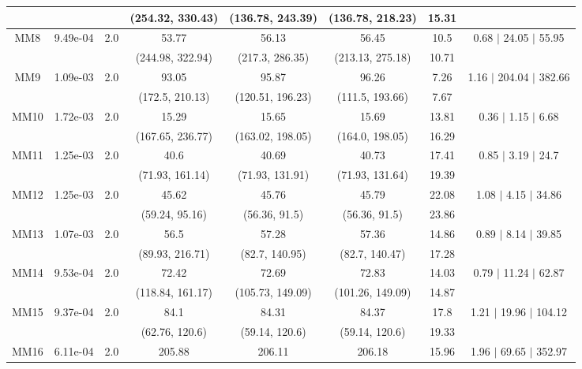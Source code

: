 \begin{longtable}{|c|c|c|c|c|c|c|c|}
	 &  &  & (254.32, 330.43) & (136.78, 243.39) & (136.78, 218.23) & 15.31 & \\
 	\hline
	\multirow{2}{*}{MM8} & \multirow{2}{*}{9.49e-04} & \multirow{2}{*}{2.0} & 53.77 & 56.13 & 56.45 & 10.5 & 0.68 $\mid$ 24.05 $\mid$ 55.95\\
	 &  &  & (244.98, 322.94) & (217.3, 286.35) & (213.13, 275.18) & 10.71 & \\
 	\hline
	\multirow{2}{*}{MM9} & \multirow{2}{*}{1.09e-03} & \multirow{2}{*}{2.0} & 93.05 & 95.87 & 96.26 & 7.26 & 1.16 $\mid$ 204.04 $\mid$ 382.66\\
	 &  &  & (172.5, 210.13) & (120.51, 196.23) & (111.5, 193.66) & 7.67 & \\
 	\hline
	\multirow{2}{*}{MM10} & \multirow{2}{*}{1.72e-03} & \multirow{2}{*}{2.0} & 15.29 & 15.65 & 15.69 & 13.81 & 0.36 $\mid$ 1.15 $\mid$ 6.68\\
	 &  &  & (167.65, 236.77) & (163.02, 198.05) & (164.0, 198.05) & 16.29 & \\
 	\hline
	\multirow{2}{*}{MM11} & \multirow{2}{*}{1.25e-03} & \multirow{2}{*}{2.0} & 40.6 & 40.69 & 40.73 & 17.41 & 0.85 $\mid$ 3.19 $\mid$ 24.7\\
	 &  &  & (71.93, 161.14) & (71.93, 131.91) & (71.93, 131.64) & 19.39 & \\
 	\hline
	\multirow{2}{*}{MM12} & \multirow{2}{*}{1.25e-03} & \multirow{2}{*}{2.0} & 45.62 & 45.76 & 45.79 & 22.08 & 1.08 $\mid$ 4.15 $\mid$ 34.86\\
	 &  &  & (59.24, 95.16) & (56.36, 91.5) & (56.36, 91.5) & 23.86 & \\
 	\hline
	\multirow{2}{*}{MM13} & \multirow{2}{*}{1.07e-03} & \multirow{2}{*}{2.0} & 56.5 & 57.28 & 57.36 & 14.86 & 0.89 $\mid$ 8.14 $\mid$ 39.85\\
	 &  &  & (89.93, 216.71) & (82.7, 140.95) & (82.7, 140.47) & 17.28 & \\
 	\hline
	\multirow{2}{*}{MM14} & \multirow{2}{*}{9.53e-04} & \multirow{2}{*}{2.0} & 72.42 & 72.69 & 72.83 & 14.03 & 0.79 $\mid$ 11.24 $\mid$ 62.87\\
	 &  &  & (118.84, 161.17) & (105.73, 149.09) & (101.26, 149.09) & 14.87 & \\
 	\hline
	\multirow{2}{*}{MM15} & \multirow{2}{*}{9.37e-04} & \multirow{2}{*}{2.0} & 84.1 & 84.31 & 84.37 & 17.8 & 1.21 $\mid$ 19.96 $\mid$ 104.12\\
	 &  &  & (62.76, 120.6) & (59.14, 120.6) & (59.14, 120.6) & 19.33 & \\
 	\hline
	\multirow{2}{*}{MM16} & \multirow{2}{*}{6.11e-04} & \multirow{2}{*}{2.0} & 205.88 & 206.11 & 206.18 & 15.96 & 1.96 $\mid$ 69.65 $\mid$ 352.97\\

\end{longtable}
